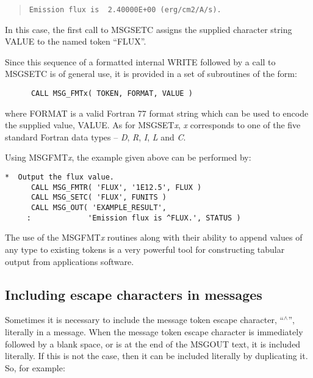 \documentclass[twoside,11pt]{article}
\newcommand{\xlabel}[1]{}
\renewcommand{\_}{\texttt{\symbol{95}}}
\begin{document}
\begin {quote}
\begin {small}
\begin{verbatim}
Emission flux is  2.40000E+00 (erg/cm2/A/s).
\end{verbatim}
\end {small}
\end {quote}

In this case, the first call to MSG\_SETC assigns the supplied character 
string VALUE to the named token ``FLUX''.

Since this sequence of a formatted internal WRITE followed by a call to
MSG\_SETC is of general use, it is provided in a set of subroutines of the
form:

\begin {small}
\begin{verbatim}
      CALL MSG_FMTx( TOKEN, FORMAT, VALUE )
\end{verbatim}
\end {small}

where FORMAT is a valid Fortran 77 format string which can be used to
encode the supplied value, VALUE.
As for MSG\_SET\textit{x}, \textit{x} corresponds to one of the five standard
Fortran data types -- \textit{D}, \textit{R}, \textit{I}, \textit{L} and \textit{C}.

Using MSG\_FMT\textit{x}, the example given above can be performed by:

\begin {small}
\begin{verbatim}
*  Output the flux value.
      CALL MSG_FMTR( 'FLUX', '1E12.5', FLUX )
      CALL MSG_SETC( 'FLUX', FUNITS )
      CALL MSG_OUT( 'EXAMPLE_RESULT', 
     :             'Emission flux is ^FLUX.', STATUS )
\end{verbatim}
\end {small}

The use of the MSG\_FMT\textit{x} routines along with their ability to append 
values of any type to existing tokens is a very powerful tool for constructing 
tabular output from applications software.


\subsection{\xlabel{including_escape_characters_in_messages}Including escape characters in messages}
Sometimes it is necessary to include the message token escape character,
``$^\wedge$'', literally in a message. 
When the message token escape character is immediately followed by a blank
space, or is at the end of the MSG\_OUT text, it is included literally. 
If this is not the case, then it can be included literally by duplicating it.
So, for example:
\end{document}
